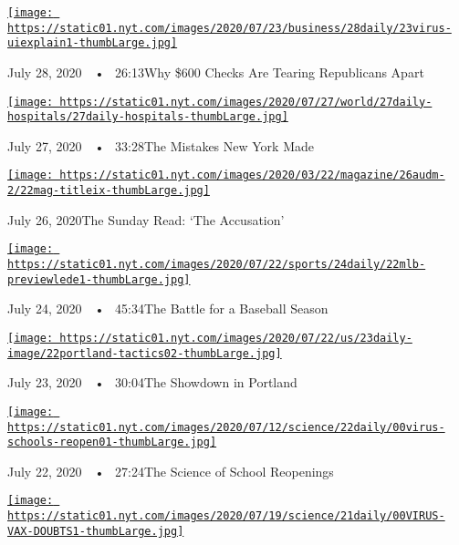 \href{https://www.nytimes.com/2020/07/28/podcasts/the-daily/unemployment-benefits-coronavirus.html?action=click\&module=audio-series-bar\&region=header\&pgtype=Article}{\texttt{[image: https://static01.nyt.com/images/2020/07/23/business/28daily/23virus-uiexplain1-thumbLarge.jpg]}}

July 28, 2020~~•~ 26:13Why \$600 Checks Are Tearing Republicans Apart

\href{https://www.nytimes.com/2020/07/27/podcasts/the-daily/new-york-hospitals-covid.html?action=click\&module=audio-series-bar\&region=header\&pgtype=Article}{\texttt{[image: https://static01.nyt.com/images/2020/07/27/world/27daily-hospitals/27daily-hospitals-thumbLarge.jpg]}}

July 27, 2020~~•~ 33:28The Mistakes New York Made

\href{https://www.nytimes.com/2020/07/26/podcasts/the-daily/the-accusation-the-sunday-read.html?action=click\&module=audio-series-bar\&region=header\&pgtype=Article}{\texttt{[image: https://static01.nyt.com/images/2020/03/22/magazine/26audm-2/22mag-titleix-thumbLarge.jpg]}}

July 26, 2020The Sunday Read: `The Accusation'

\href{https://www.nytimes.com/2020/07/24/podcasts/the-daily/mlb-baseball-season-coronavirus.html?action=click\&module=audio-series-bar\&region=header\&pgtype=Article}{\texttt{[image: https://static01.nyt.com/images/2020/07/22/sports/24daily/22mlb-previewlede1-thumbLarge.jpg]}}

July 24, 2020~~•~ 45:34The Battle for a Baseball Season

\href{https://www.nytimes.com/2020/07/23/podcasts/the-daily/portland-protests.html?action=click\&module=audio-series-bar\&region=header\&pgtype=Article}{\texttt{[image: https://static01.nyt.com/images/2020/07/22/us/23daily-image/22portland-tactics02-thumbLarge.jpg]}}

July 23, 2020~~•~ 30:04The Showdown in Portland

\href{https://www.nytimes.com/2020/07/22/podcasts/the-daily/school-reopenings-coronavirus.html?action=click\&module=audio-series-bar\&region=header\&pgtype=Article}{\texttt{[image: https://static01.nyt.com/images/2020/07/12/science/22daily/00virus-schools-reopen01-thumbLarge.jpg]}}

July 22, 2020~~•~ 27:24The Science of School Reopenings

\href{https://www.nytimes.com/2020/07/21/podcasts/the-daily/coronavirus-vaccine.html?action=click\&module=audio-series-bar\&region=header\&pgtype=Article}{\texttt{[image: https://static01.nyt.com/images/2020/07/19/science/21daily/00VIRUS-VAX-DOUBTS1-thumbLarge.jpg]}}

